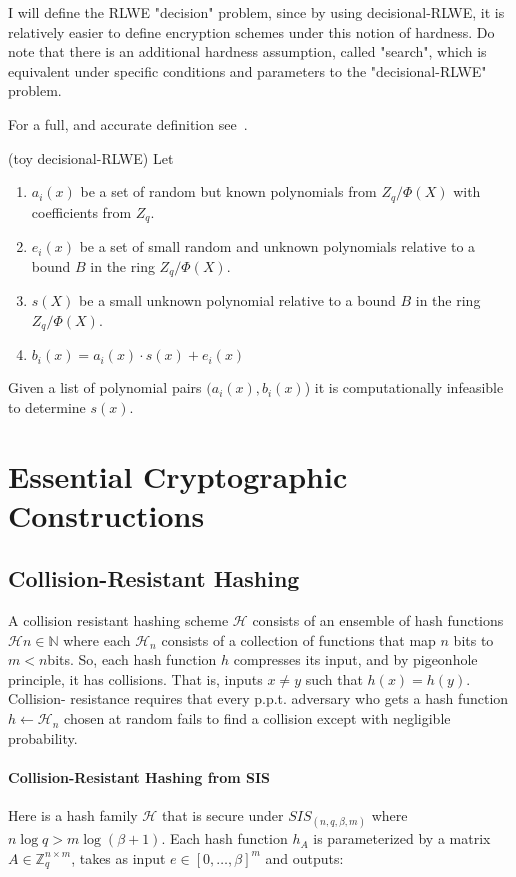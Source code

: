 I will define the RLWE "decision" problem, since by using decisional-RLWE,
it is relatively easier to define encryption schemes under this notion of hardness.
Do note that there is an additional hardness assumption, called "search", 
which is equivalent under specific conditions and parameters to 
the "decisional-RLWE" problem.

For a full, and accurate definition see~\cite[def 3.3]{RLWE}.
\begin{definition} (toy decisional-RLWE)
    Let 
    \begin{enumerate}
        \item $a_i(x)$ be a set of random but known polynomials from $Z_q/\Phi(X)$ with 
        coefficients from $Z_q$.
        \item  $e_i(x)$ be a set of small random and unknown polynomials 
        relative to a bound $B$ in the ring $Z_q/\Phi(X)$.
        \item $s(X)$ be a small unknown polynomial 
        relative to a bound $B$ in the ring $Z_q/\Phi(X)$.
        \item $b_i(x)=a_i(x)\cdot s(x) + e_i(x)$
    \end{enumerate}
    
    Given a list of polynomial pairs $(a_i(x),b_i(x)$) it is computationally infeasible 
    to determine $s(x)$.
\end{definition}



\section{Essential Cryptographic Constructions}


\subsection{Collision-Resistant Hashing}
A collision resistant hashing scheme $\mathcal{H}$ consists of an ensemble of hash functions ${\mathcal{H}}n\in\mathbb{N}$ where each $\mathcal{H}_n$
consists of a collection of functions that map $n$ bits to $m<n$bits. So, each hash function $h$ compresses its
input, and by pigeonhole principle, it has collisions. That is, inputs $x\neq y$ such that $h(x)=h(y)$. Collision-
resistance requires that every p.p.t. adversary who gets a hash function $h \leftarrow \mathcal{H}_n$ chosen at random fails to find a collision except with negligible probability.

\paragraph{\bf Collision-Resistant Hashing from SIS}
Here is a hash family ${\mathcal{H}}$ that is secure under $SIS_{(n,q,\beta,m)}$
where $n \log q >  m \log (\beta +1)$. Each hash function $h_A$ is parameterized by a matrix 
$A\in \mathbb{Z}^{n\times m}_q$, takes as input $e\in [0,\dots,\beta]^m$ and outputs:

